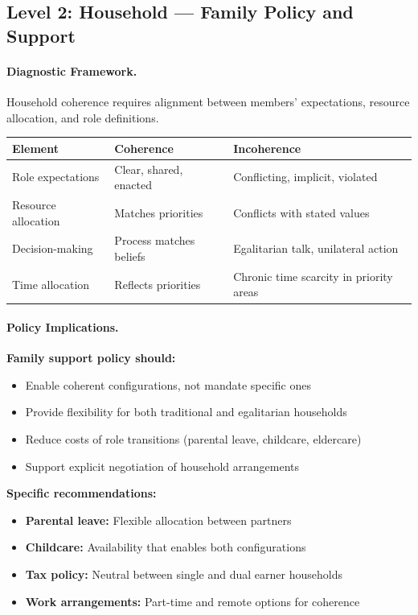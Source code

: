 \documentclass[12pt,a4paper]{article}
\begin{document}
\subsection{Level 2: Household --- Family Policy and Support}

\paragraph{Diagnostic Framework.}
Household coherence requires alignment between members' expectations,
resource allocation, and role definitions.

\begin{center}
\renewcommand{\arraystretch}{1.2}
\begin{tabular}{lll}
\hline
\textbf{Element} & \textbf{Coherence} & \textbf{Incoherence} \\
\hline
Role expectations & Clear, shared, enacted & Conflicting, implicit, violated \\
Resource allocation & Matches priorities & Conflicts with stated values \\
Decision-making & Process matches beliefs & Egalitarian talk, unilateral action \\
Time allocation & Reflects priorities & Chronic time scarcity in priority areas \\
\hline
\end{tabular}
\end{center}

\paragraph{Policy Implications.}
\textbf{Family support policy should:}
\begin{itemize}
  \item Enable coherent configurations, not mandate specific ones
  \item Provide flexibility for both traditional and egalitarian households
  \item Reduce costs of role transitions (parental leave, childcare, eldercare)
  \item Support explicit negotiation of household arrangements
\end{itemize}

\textbf{Specific recommendations:}
\begin{itemize}
  \item \textbf{Parental leave:} Flexible allocation between partners
  \item \textbf{Childcare:} Availability that enables both configurations
  \item \textbf{Tax policy:} Neutral between single and dual earner households
  \item \textbf{Work arrangements:} Part-time and remote options for coherence
\end{itemize}
\end{document}
